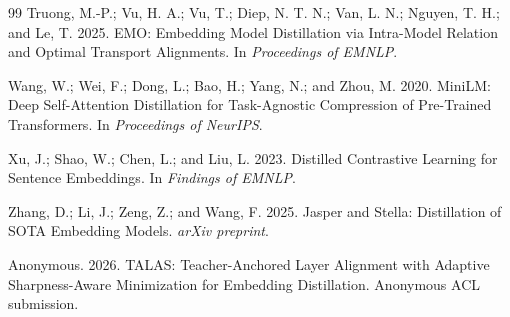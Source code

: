 \documentclass[letterpaper]{article}
\begin{document}
\begin{thebibliography}{99}
Truong, M.-P.; Vu, H. A.; Vu, T.; Diep, N. T. N.; Van, L. N.; Nguyen, T. H.; and Le, T. 2025.
EMO: Embedding Model Distillation via Intra-Model Relation and Optimal Transport Alignments.
In \emph{Proceedings of EMNLP}.

Wang, W.; Wei, F.; Dong, L.; Bao, H.; Yang, N.; and Zhou, M. 2020.
MiniLM: Deep Self-Attention Distillation for Task-Agnostic Compression of Pre-Trained Transformers.
In \emph{Proceedings of NeurIPS}.

Xu, J.; Shao, W.; Chen, L.; and Liu, L. 2023.
Distilled Contrastive Learning for Sentence Embeddings.
In \emph{Findings of EMNLP}.

Zhang, D.; Li, J.; Zeng, Z.; and Wang, F. 2025.
Jasper and Stella: Distillation of SOTA Embedding Models.
\emph{arXiv preprint}.

Anonymous. 2026.
TALAS: Teacher-Anchored Layer Alignment with Adaptive Sharpness-Aware Minimization for Embedding Distillation.
Anonymous ACL submission.

\end{thebibliography}
\end{document}
